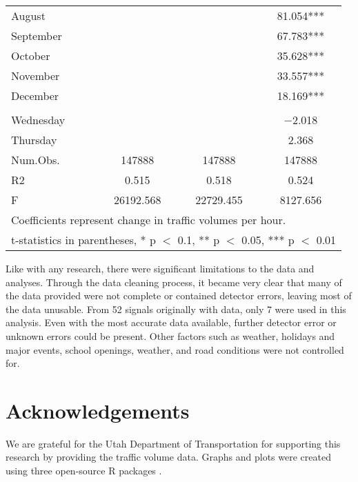 \documentclass[3p, authoryear]{elsarticle} %
\begin{document}
\begin{table}
\begin{tabular}[t]{lccc}
\hspace{1em}August &  &  & \num{81.054}***\\
\hspace{1em}September &  &  & \num{67.783}***\\
\hspace{1em}October &  &  & \num{35.628}***\\
\hspace{1em}November &  &  & \num{33.557}***\\
\hspace{1em}December &  &  & \num{18.169}***\\
\addlinespace[0.3em]
\multicolumn{4}{l}{\textbf{Day}}\\
\hspace{1em}Wednesday &  &  & \num{-2.018}\\
\hspace{1em}Thursday &  &  & \num{2.368}\\
\midrule
Num.Obs. & \num{147888} & \num{147888} & \num{147888}\\
R2 & \num{0.515} & \num{0.518} & \num{0.524}\\
F & \num{26192.568} & \num{22729.455} & \num{8127.656}\\
\bottomrule
\multicolumn{4}{l}{\rule{0pt}{1em}Coefficients represent change in traffic volumes per hour.}\\
\multicolumn{4}{l}{\rule{0pt}{1em}t-statistics in parentheses, * p $<$ 0.1, ** p $<$ 0.05, *** p $<$ 0.01}\\
\end{tabular}
\end{table}

Like with any research, there were significant limitations to the data and analyses. Through the data
cleaning process, it became very clear that many of the data provided were not complete or contained
detector errors, leaving most of the data unusable. From 52 signals originally with data, only 7 were used
in this analysis. Even with the most accurate data available, further detector error or unknown errors could
be present. Other factors such as weather, holidays and major events, school openings, weather, and road
conditions were not controlled for.

\hypertarget{acknowledgements}{%
\section{Acknowledgements}\label{acknowledgements}}

We are grateful for the Utah Department of Transportation for supporting this research by providing the traffic volume data. Graphs and plots were created using three open-source R packages \citep{modelsummary, ggplot2, kableExtra}.


\end{document}
